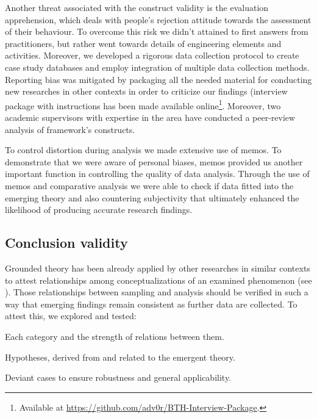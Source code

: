 \documentclass[10pt,journal,letterpaper,compsoc]{IEEEtran}
\begin{document}
Another threat associated with the construct validity is the evaluation 
apprehension, which deals with people's rejection attitude towards the 
assessment of their behaviour. To overcome this risk we didn't attained to first 
answers from practitioners, but rather went towards details of engineering 
elements and activities. Moreover, we developed a rigorous data collection 
protocol to create case study databases and employ integration of multiple data 
collection methods. Reporting bias was mitigated by packaging all the needed 
material for conducting new researches in other contexts in order to criticize 
our findings (interview package with instructions has been made available 
online\footnote{Available at 
\url{https://github.com/adv0r/BTH-Interview-Package}.}. Moreover, two academic 
supervisors with expertise in the area have conducted a peer-review analysis of 
framework's constructs.

To control distortion during analysis we made extensive use of memos. To 
demonstrate that we were aware of personal biases, memos provided us another 
important function in controlling the quality of data analysis. Through the use 
of memos and comparative analysis we were able to check if data fitted into the 
emerging theory and also countering subjectivity that ultimately enhanced the 
likelihood of producing accurate research findings.

\subsection{Conclusion validity}

Grounded theory has been already applied by other researches in similar 
contexts to attest relationships among conceptualizations of an examined 
phenomenon (see \cite{Coleman2007, Basri, Coleman2008a}). Those relationships 
between sampling and analysis should be verified in such a way that emerging 
findings remain consistent as further data are collected. To attest this, we  
explored and tested:


\begin{compactitem}
\item Each category and the strength of relations between them.
\item Hypotheses, derived from and related to the emergent theory.
\item Deviant cases to ensure robustness and general applicability.
\end{compactitem}
\end{document}
